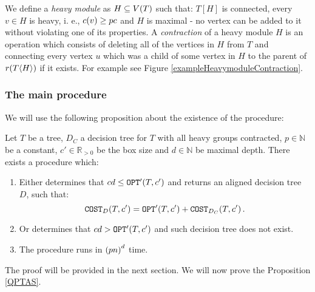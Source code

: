 
We define a \textit{heavy module} as $H\subseteq V\mathopen{}\left( T \right)$ such that: $T[H]$ is connected, every $v \in H$ is heavy, i. e., $c\mathopen{}\left( v \right)\geq pc$ and $H$ is maximal - no vertex can be added to it without violating one of its properties. A \textit{contraction} of a heavy module $H$ is an operation which consists of deleting all of the vertices in $H$ from $T$ and connecting every vertex $u$ which was a child of some vertex in $H$ to the parent of $r\mathopen{}\left( T\mathopen{}\langle H \rangle \right)$ if it exists. For example see Figure \ref{exampleHeavymoduleContraction}.

\subsubsection{The main procedure}

We will use the following proposition about the existence of the \FBuildDT procedure:
\begin{proposition}\label{BuildDTPropodisition}
     Let $T$ be a tree, $D_C$ a decision tree for $T$ with all heavy groups contracted, $p\in \mathbb{N}$ be a constant, $c'\in \mathbb{R}_{>0}$ be the box size and $d\in \mathbb{N}$ be maximal depth. There exists a \FBuildDT procedure which:
     \begin{enumerate}
        \item Either determines that $cd\leq \texttt{OPT}'\mathopen{}\left( T, c' \right)$ and returns an aligned decision tree $D$, such that:
        $$
            \texttt{COST}_{D}\mathopen{}\left( T,c' \right)=\texttt{OPT}'\mathopen{}\left( T,c' \right)+\texttt{COST}_{D_C}\mathopen{}\left( T,c' \right).
        $$
        \item Or determines that $cd > \texttt{OPT}'\mathopen{}\left( T, c' \right)$ and such decision tree does not exist.
        \item The procedure runs in $\mathopen{}\left( pn \right)^d$ time.
     \end{enumerate}
\end{proposition}
The proof will be provided in the next section.
We will now prove the Proposition \ref{QPTAS}.



